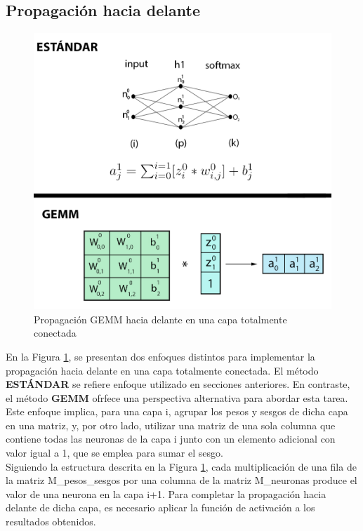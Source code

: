 \subsection{Propagación hacia delante}

\begin{figure}[H]
	\centering
	\includegraphics[scale=0.3]{imagenes/gemm_fully_forward.jpg}  
	\caption{Propagación GEMM hacia delante en una capa totalmente conectada}
	\label{fig:gemm_fully_forward}
\end{figure}

En la Figura \ref{fig:gemm_fully_forward}, se presentan dos enfoques distintos para implementar la propagación hacia delante en una capa totalmente conectada. El método \textbf{ESTÁNDAR} se refiere enfoque utilizado en secciones anteriores. En contraste, el método \textbf{GEMM} ofrfece una perspectiva alternativa para abordar esta tarea. Este enfoque implica, para una capa i, agrupar los pesos y sesgos de dicha capa en una matriz, y, por otro lado, utilizar una matriz de una sola columna que contiene todas las neuronas de la capa i junto con un elemento adicional con valor igual a 1, que se emplea para sumar el sesgo. \\
Siguiendo la estructura descrita en la Figura \ref{fig:gemm_fully_forward}, cada multiplicación de una fila de la matriz M\_pesos\_sesgos por una columna de la matriz M\_neuronas produce el valor de una neurona en la capa i+1. Para completar la propagación hacia delante de dicha capa, es necesario aplicar la función de activación a los resultados obtenidos.

